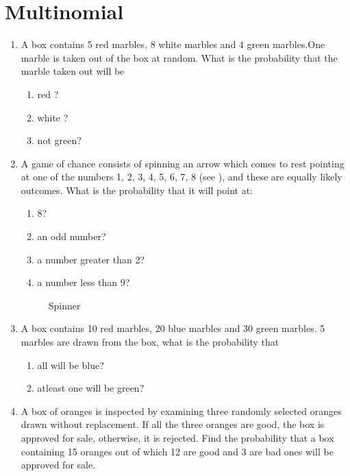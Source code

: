     \section{Multinomial}
\begin{enumerate}[label=\thesection.\arabic*,ref=\thesection.\theenumi]
\item A box contains 5 red marbles, 8 white marbles and 4 green marbles.One marble is taken
out of the box at random. What is the probability that the marble taken out will be 
\\
\solution
\begin{enumerate}
    \item red ? 
    \item white ? 
    \item  not green?
\end{enumerate}
\solution

\item A game of chance consists of spinning an arrow
which comes to rest pointing at one of the numbers
1, 2, 3, 4, 5, 6, 7, 8 (see ), and these are equally
likely outcomes. What is the probability that it will
point at:
\begin{enumerate}
\item 
8?
\item 
an odd number?
\item 
a number greater than 2?
\item 
a number less than 9?
\end{enumerate}
\begin{figure} [p h]
	\centering
	\resizebox{\columnwidth}{!}{}
    \caption{Spinner}
    \label{fig:ncert/10/15/1/12/my_label}
\end{figure}
\solution

\item A box contains 10 red marbles, 20 blue marbles and 30 green marbles. 5 marbles
are drawn from the box, what is the probability that
\begin{enumerate}
\item all will be blue?
\item atleast one will be green?
\end{enumerate}
\solution

\item A box of oranges is inspected by examining three randomly selected oranges drawn without replacement. If all the three oranges are good, the box is approved for sale, otherwise, it is rejected. Find the probability that a box containing 15 oranges out of which 12 are good and 3 are bad ones will be approved for sale.\\
	\solution

    \end{enumerate}
